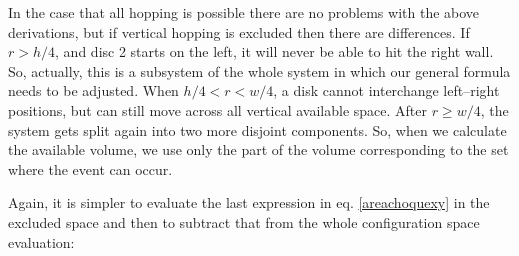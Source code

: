\documentclass[superscriptaddress,pre,reprint,showpacs,twocolumn]{revtex4-1}
\begin{document}
    
    In the case that all hopping is possible there are no problems with the above derivations,
    but if vertical hopping is excluded then there are differences.
 If $r>h/4$, and disc 2 starts
    on the left, it will never be able to hit the right wall. So, actually, this
    is a subsystem of the whole  system in which our general formula needs
    to be adjusted. 
    When $h/4<r<w/4$, a disk cannot interchange left--right positions,
    but can still move across all vertical available space.  After $r\geq w/4$,
    the system gets split again into two more disjoint components.
    So, when we calculate the available volume, we use only the
    part of the volume corresponding to the set where the event can occur.
    
    Again, it is simpler to evaluate the last expression in eq. \ref{areachoquexy}
    in the excluded space and then to subtract that from the whole configuration
    space evaluation:
\end{document}
